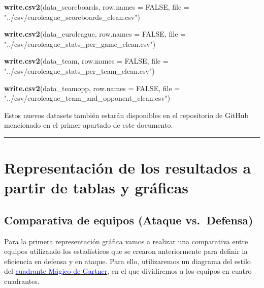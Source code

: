 \documentclass[
]{article}
\newenvironment{Shaded}{\begin{snugshade}}{\end{snugshade}}
\newcommand{\DataTypeTok}[1]{\textcolor[rgb]{0.13,0.29,0.53}{#1}}
\newcommand{\KeywordTok}[1]{\textcolor[rgb]{0.13,0.29,0.53}{\textbf{#1}}}
\newcommand{\NormalTok}[1]{#1}
\newcommand{\OtherTok}[1]{\textcolor[rgb]{0.56,0.35,0.01}{#1}}
\newcommand{\StringTok}[1]{\textcolor[rgb]{0.31,0.60,0.02}{#1}}
\begin{document}
\begin{Shaded}
\begin{Highlighting}[]
\KeywordTok{write.csv2}\NormalTok{(data_scoreboards, }\DataTypeTok{row.names =} \OtherTok{FALSE}\NormalTok{, }
           \DataTypeTok{file =} \StringTok{"../csv/euroleague_scoreboards_clean.csv"}\NormalTok{)}

\KeywordTok{write.csv2}\NormalTok{(data_euroleague, }\DataTypeTok{row.names =} \OtherTok{FALSE}\NormalTok{, }
           \DataTypeTok{file =} \StringTok{"../csv/euroleague_stats_per_game_clean.csv"}\NormalTok{)}

\KeywordTok{write.csv2}\NormalTok{(data_team, }\DataTypeTok{row.names =} \OtherTok{FALSE}\NormalTok{, }
           \DataTypeTok{file =} \StringTok{"../csv/euroleague_stats_per_team_clean.csv"}\NormalTok{)}

\KeywordTok{write.csv2}\NormalTok{(data_teamopp, }\DataTypeTok{row.names =} \OtherTok{FALSE}\NormalTok{, }
           \DataTypeTok{file =} \StringTok{"../csv/euroleague_team_and_opponent_clean.csv"}\NormalTok{)}
\end{Highlighting}
\end{Shaded}

Estos nuevos datasets también estarán disponibles en el repositorio de
GitHub mencionado en el primer apartado de este documento.

\begin{center}\rule{0.5\linewidth}{0.5pt}\end{center}

\newpage

\hypertarget{representaciuxf3n-de-los-resultados-a-partir-de-tablas-y-gruxe1ficas}{%
\section{Representación de los resultados a partir de tablas y
gráficas}\label{representaciuxf3n-de-los-resultados-a-partir-de-tablas-y-gruxe1ficas}}

\hypertarget{comparativa-de-equipos-ataque-vs.-defensa}{%
\subsection{Comparativa de equipos (Ataque
vs.~Defensa)}\label{comparativa-de-equipos-ataque-vs.-defensa}}

Para la primera representación gráfica vamos a realizar una comparativa
entre equipos utilizando los estadísticos que se crearon anteriormente
para definir la eficiencia en defensa y en ataque. Para ello,
utilizaremos un diagrama del estilo del
\href{https://www.euroleague.net/}{\textcolor{blue}{cuadrante Mágico de Gartner}},
en el que dividiremos a los equipos en cuatro cuadrantes.
\end{document}

